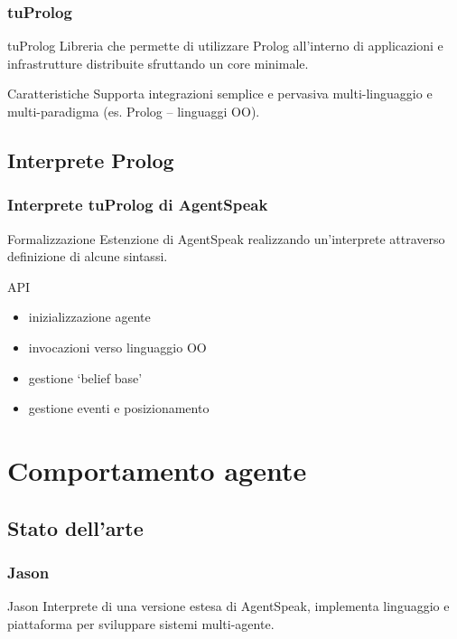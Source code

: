 \documentclass[handout]{beamer}\mode<presentation>{\usetheme{AMSCesenaBleu}}
\begin{document}
\begin{frame}
\frametitle{tuProlog}
\begin{block}{tuProlog}
Libreria che permette di utilizzare Prolog all'interno di applicazioni e infrastrutture distribuite sfruttando un core minimale.
\end{block}

\begin{block}{Caratteristiche}
Supporta integrazioni semplice e pervasiva multi-linguaggio e multi-paradigma (es. Prolog -- linguaggi OO).

\end{block}
\end{frame}


\subsection{Interprete Prolog}

\begin{frame}
\frametitle{Interprete tuProlog di AgentSpeak}
\begin{block}{Formalizzazione}
Estenzione di AgentSpeak realizzando un'interprete attraverso definizione di alcune sintassi.
\end{block}

\begin{block}{API}
\begin{itemize}
\item inizializzazione agente
\item invocazioni verso linguaggio OO
\item gestione `belief base'
\item gestione eventi e posizionamento
\end{itemize}
\end{block}
\end{frame}



\section{Comportamento agente}

\subsection{Stato dell'arte}

\begin{frame}
\frametitle{Jason}
\begin{block}{Jason}
Interprete di una versione estesa di AgentSpeak, implementa linguaggio e piattaforma per sviluppare sistemi multi-agente.
\end{block}
\end{frame}
\end{document}

